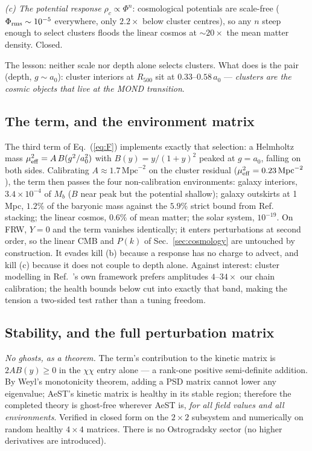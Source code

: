 \documentclass[aps,prd,twocolumn,10pt,nofootinbib,superscriptaddress]{revtex4-2}
\begin{document}
\emph{(c) The potential response} $\rho_c\propto\Phi^n$: cosmological potentials are scale-free
($\Phi_{\rm rms}\sim10^{-5}$ everywhere, only $2.2\times$ below cluster centres), so any $n$ steep
enough to select clusters floods the linear cosmos at $\sim20\times$ the mean matter density.
Closed.

The lesson: neither scale nor depth alone selects clusters. What does is the pair (depth,
$g\sim a_0$): cluster interiors at $R_{500}$ sit at $0.33$--$0.58\,a_0$ --- \emph{clusters are the
cosmic objects that live at the MOND transition}.

\subsection{The term, and the environment matrix}

The third term of Eq.~(\ref{eq:F}) implements exactly that selection: a Helmholtz mass
$\mu^2_{\rm eff}=A\,B(g^2/a_0^2)$ with $B(y)=y/(1+y)^2$ peaked at $g=a_0$, falling on both sides.
Calibrating $A\approx1.7\,\mathrm{Mpc}^{-2}$ on the cluster residual
($\mu^2_{\rm eff}=0.23\,\mathrm{Mpc}^{-2}$), the term then passes the four non-calibration
environments: galaxy interiors, $3.4\times10^{-4}$ of $M_b$ ($B$ near peak but the potential
shallow); galaxy outskirts at 1 Mpc, $1.2\%$ of the baryonic mass against the $5.9\%$ strict bound
from Ref.~\cite{Mistele2023} stacking; the linear cosmos, $0.6\%$ of mean matter; the solar system,
$10^{-19}$. On FRW, $Y=0$ and the term vanishes identically; it enters perturbations at second
order, so the linear CMB and $P(k)$ of Sec.~\ref{sec:cosmology} are untouched by construction. It
evades kill (b) because a response has no charge to advect, and kill (c) because it does not couple
to depth alone. Against interest: cluster modelling in Ref.~\cite{Mistele2023}'s own framework
prefers amplitudes $4$--$34\times$ our chain calibration; the health bounds below cut into exactly
that band, making the tension a two-sided test rather than a tuning freedom.

\subsection{Stability, and the full perturbation matrix}
\label{sec:health}

\emph{No ghosts, as a theorem.} The term's contribution to the kinetic matrix is
$2AB(y)\ge0$ in the $\chi\chi$ entry alone --- a rank-one positive semi-definite addition. By Weyl's
monotonicity theorem, adding a PSD matrix cannot lower any eigenvalue; AeST's kinetic matrix is
healthy in its stable region; therefore the completed theory is ghost-free wherever AeST is,
\emph{for all field values and all environments}. Verified in closed form on the $2\times2$
subsystem and numerically on random healthy $4\times4$ matrices. There is no Ostrogradsky sector
(no higher derivatives are introduced).
\end{document}
